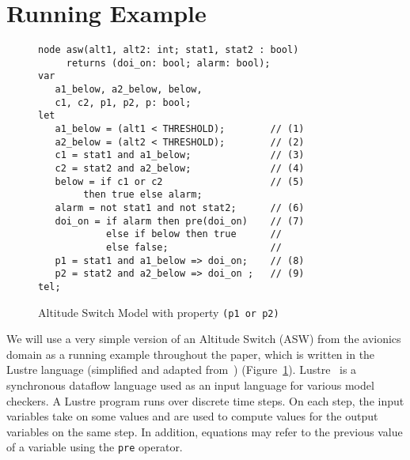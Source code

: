 \section{Running Example}
\label{sec:example}


\begin{figure}[t]
\centering
{\smaller
\begin{verbatim}
node asw(alt1, alt2: int; stat1, stat2 : bool) 
     returns (doi_on: bool; alarm: bool);
var
   a1_below, a2_below, below, 
   c1, c2, p1, p2, p: bool; 
let
   a1_below = (alt1 < THRESHOLD);        // (1)
   a2_below = (alt2 < THRESHOLD);        // (2) 
   c1 = stat1 and a1_below;              // (3)
   c2 = stat2 and a2_below;              // (4)
   below = if c1 or c2                   // (5)
        then true else alarm;
   alarm = not stat1 and not stat2;      // (6) 
   doi_on = if alarm then pre(doi_on)    // (7)
            else if below then true      //
            else false;                  //
   p1 = stat1 and a1_below => doi_on;    // (8)
   p2 = stat2 and a2_below => doi_on ;   // (9)
tel;
\end{verbatim}
}
\vspace{-0.1in}
\caption{Altitude Switch Model with property \small{\texttt{(p1 or p2)}}}
\label{fig:asw}
\end{figure}

We will use a very simple version of an Altitude Switch (ASW) from the avionics domain as a running example throughout the paper, which is written in the Lustre language (simplified and adapted from~\cite{HCW02:ase-deviation}) (Figure~\ref{fig:asw}). 
Lustre~\cite{Halbwachs91:lustre} is a synchronous dataflow language
used as an input language for various model checkers. A Lustre program runs over discrete
time steps. On each step, the input variables take on some values and
are used to compute values for the output variables on the same step.
In addition, equations may refer to the previous value of a variable
using the {\tt pre} operator.

